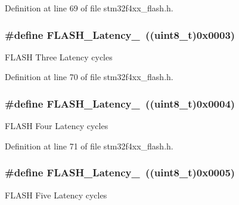Definition at line 69 of file stm32f4xx\-\_\-flash.\-h.

\hypertarget{group___flash___latency_ga13fbc5a6423848be5bf631dc437bbc3f}{
\subsubsection[{F\-L\-A\-S\-H\-\_\-\-Latency\-\_\-3}]{\setlength{\rightskip}{0pt plus 5cm}\#define F\-L\-A\-S\-H\-\_\-\-Latency\-\_~((uint8\-\_\-t)0x0003)}}\label{group___flash___latency_ga13fbc5a6423848be5bf631dc437bbc3f}
F\-L\-A\-S\-H Three Latency cycles 

Definition at line 70 of file stm32f4xx\-\_\-flash.\-h.

\hypertarget{group___flash___latency_ga74a5deaec2020e484ce576925ff7de16}{
\subsubsection[{F\-L\-A\-S\-H\-\_\-\-Latency\-\_\-4}]{\setlength{\rightskip}{0pt plus 5cm}\#define F\-L\-A\-S\-H\-\_\-\-Latency\-\_~((uint8\-\_\-t)0x0004)}}\label{group___flash___latency_ga74a5deaec2020e484ce576925ff7de16}
F\-L\-A\-S\-H Four Latency cycles 

Definition at line 71 of file stm32f4xx\-\_\-flash.\-h.

\hypertarget{group___flash___latency_ga8e52670ad258b0a95c94b99b8d7eab27}{
\subsubsection[{F\-L\-A\-S\-H\-\_\-\-Latency\-\_\-5}]{\setlength{\rightskip}{0pt plus 5cm}\#define F\-L\-A\-S\-H\-\_\-\-Latency\-\_~((uint8\-\_\-t)0x0005)}}\label{group___flash___latency_ga8e52670ad258b0a95c94b99b8d7eab27}
F\-L\-A\-S\-H Five Latency cycles 

